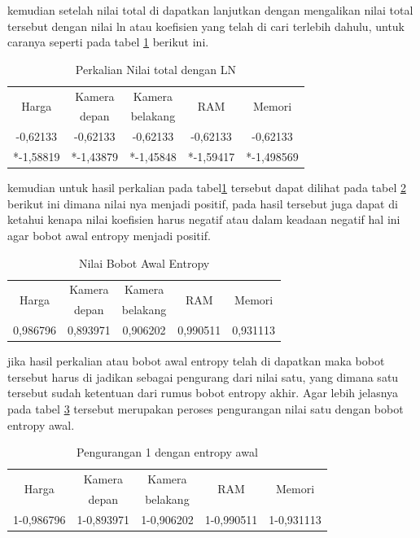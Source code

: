 kemudian setelah nilai total di dapatkan lanjutkan dengan mengalikan nilai total tersebut dengan nilai ln atau koefisien yang telah di cari terlebih dahulu, untuk caranya seperti pada tabel \ref{TA8} berikut ini.


\begin{table}[h]
\caption{Perkalian Nilai total dengan LN}
\centering
\begin{tabular}{|c|c|c|c|c|}
\hline
\multirow{2}{*}{ Harga}& Kamera & Kamera&\multirow{2}{*}{RAM}& \multirow{2}{*}{Memori}\\
& depan & belakang & &\\
\hline
-0,62133& -0,62133 & -0,62133 & -0,62133 & -0,62133\\
*-1,58819& *-1,43879 & *-1,45848 & *-1,59417 & *-1,498569\\
\hline
\end{tabular}
\label{TA8}
\end{table}

kemudian untuk hasil perkalian pada tabel\ref{TA8} tersebut dapat dilihat pada tabel \ref{TA9} berikut ini dimana nilai nya menjadi positif, pada hasil tersebut juga dapat di ketahui kenapa nilai koefisien harus negatif atau dalam keadaan negatif hal ini agar bobot awal entropy menjadi positif.
\pagebreak

\begin{table}[h]
\caption{Nilai Bobot Awal Entropy}
\centering
\begin{tabular}{|c|c|c|c|c|}
\hline
\multirow{2}{*}{ Harga}& Kamera & Kamera&\multirow{2}{*}{RAM}& \multirow{2}{*}{Memori}\\
& depan & belakang & &\\
\hline
0,986796& 0,893971 & 0,906202 & 0,990511 & 0,931113\\
\hline

\end{tabular}
\label{TA9}
\end{table}

jika hasil perkalian atau bobot awal entropy telah di dapatkan maka bobot tersebut harus di jadikan sebagai pengurang dari nilai satu, yang dimana satu tersebut sudah ketentuan dari rumus bobot entropy akhir. Agar lebih jelasnya pada tabel \ref{TA10} tersebut merupakan peroses pengurangan nilai satu dengan bobot entropy awal.

\begin{table}[h]
\caption{Pengurangan 1 dengan entropy awal}
\centering
\begin{tabular}{|c|c|c|c|c|}
\hline
\multirow{2}{*}{ Harga}& Kamera & Kamera&\multirow{2}{*}{RAM}& \multirow{2}{*}{Memori}\\
& depan & belakang & &\\
\hline
1-0,986796& 1-0,893971 & 1-0,906202 & 1-0,990511 & 1-0,931113\\
\hline

\end{tabular}
\label{TA10}
\end{table}

